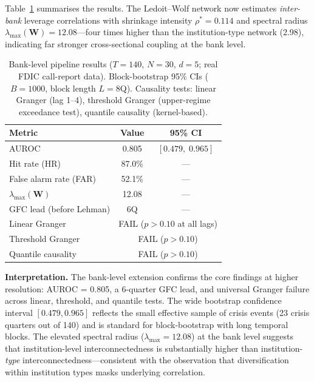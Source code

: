 \documentclass[11pt]{article}
\theoremstyle{definition}
\newcommand{\lmax}{\lambda_{\max}}
\begin{document}
Table~\ref{tab:banklevel} summarises the results.  The Ledoit--Wolf network
now estimates \emph{inter-bank} leverage correlations with shrinkage intensity
$\rho^* = 0.114$ and spectral radius $\lmax(\mathbf{W}) = 12.08$---four
times higher than the institution-type network (2.98), indicating far stronger
cross-sectional coupling at the bank level.

\begin{table}[htbp]
\centering
\caption{Bank-level pipeline results ($T=140$, $N=30$, $d=5$; real FDIC
call-report data).  Block-bootstrap 95\% CIs ($B=1000$, block length $L=8$Q).
Causality tests: linear Granger (lag 1--4), threshold Granger (upper-regime
exceedance test), quantile causality (kernel-based).}
\label{tab:banklevel}
\begin{tabular}{lcc}
\toprule
Metric & Value & 95\% CI \\
\midrule
AUROC                     & 0.805 & $[0.479,\; 0.965]$ \\
Hit rate (HR)             & 87.0\% & --- \\
False alarm rate (FAR)    & 52.1\% & --- \\
$\lmax(\mathbf{W})$       & 12.08 & --- \\
GFC lead (before Lehman)  & 6Q    & --- \\
\midrule
Linear Granger            & \multicolumn{2}{c}{FAIL ($p > 0.10$ at all lags)} \\
Threshold Granger         & \multicolumn{2}{c}{FAIL ($p > 0.10$)} \\
Quantile causality        & \multicolumn{2}{c}{FAIL ($p > 0.10$)} \\
\bottomrule
\end{tabular}
\end{table}

\noindent\textbf{Interpretation.}
The bank-level extension confirms the core findings at higher resolution:
AUROC = 0.805, a 6-quarter GFC lead, and universal Granger failure across
linear, threshold, and quantile tests.  The wide bootstrap confidence interval
$[0.479, 0.965]$ reflects the small effective sample of crisis events (23 crisis
quarters out of 140) and is standard for block-bootstrap with long temporal
blocks.  The elevated spectral radius ($\lmax = 12.08$) at the bank level
suggests that institution-level interconnectedness is substantially higher than
institution-\emph{type} interconnectedness---consistent with the observation
that diversification within institution types masks underlying correlation.
\end{document}
